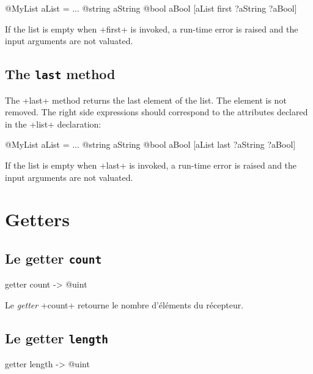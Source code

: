 \begin{galgas}
@MyList aList = ...
@string aString
@bool aBool
[aList first ?aString ?aBool]
\end{galgas}

If the list is empty when \ggs+first+ is invoked, a run-time error is raised and the input arguments are not valuated.

\subsection{The \texttt{last} method}

The \ggs+last+ method returns the last element of the list. The element is not removed. The right side expressions should correspond to the attributes declared in the \ggs+list+ declaration:\\

\begin{galgas}
@MyList aList = ...
@string aString
@bool aBool
[aList last ?aString ?aBool]
\end{galgas}


If the list is empty when \ggs+last+ is invoked, a run-time error is raised and the input arguments are not valuated.








\section{Getters}

\subsection{Le getter \texttt{count}}

\begin{galgas}
getter count -> @uint
\end{galgas}

Le \emph{getter} \ggs+count+ retourne le nombre d'éléments du récepteur.



\subsection{Le getter \texttt{length}}

\begin{galgas}
getter length -> @uint
\end{galgas}

